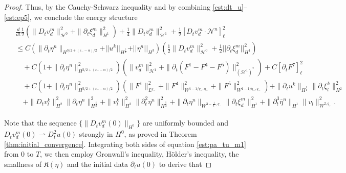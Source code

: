 \documentclass[letterpaper,reqno,10pt,twoside]{amsart}
\theoremstyle{definition}
\theoremstyle{remark}
\def\p{\partial}
\begin{document}
\begin{proof}
		Thus, by the Cauchy-Schwarz inequality and by combining \eqref{est:dt_u}--\eqref{est:ep5}, we conclude the energy structure
		\begin{align}
			\begin{aligned}
				&\frac{d}{dt}\frac12\left(\|D_tv_{d}^m\|_{\mathcal{H}^0}^2+\|\partial_{t}\xi_{d}^{m}\|_{H^{1}}^2\right)+\frac14\|D_tv_{d}^m\|_{\mathcal{H}^1}^2+\frac12[D_{t}v_{d}^{m}\cdot \mathcal{N}^{n}]_\ell^2\\
				&\le C(\|\p_t\eta^{n}\|_{H^{3/2+(\varepsilon_--\alpha)/2}}+\vert \vert u^{k}\vert \vert_{H^{\frac{5}{2}}}+\vert \vert \eta^{n}\vert \vert_{H^{3}})\left(\frac12\|D_tv_{d}^m\|_{\mathcal{H}^0}^2+\frac{1}{2}\vert \vert \partial_{t}\xi_{d}^{m}\vert \vert_{H^{1}}^{2}\right)\\
				&\quad +C\left(1+\|\p_t\eta^{n}\|_{H^{3/2+(\varepsilon_--\alpha)/2}}^2\right) ( \|v_{d}^m\|_{\mathcal{H}^1}^2 +\|\p_t(F^1-F^4-F^5)\|_{(\mathcal{H}^1)^{\ast}}^2)+C[\p_tF^7]_\ell^2\\
				&\quad+C\left(1+\|\p_t\eta^{n}\|_{H^{3/2+(\varepsilon_--\alpha)/2}}^2\right)(\|F^1\|_{L^{q_-}}^2+\|F^4\|_{W^{1-1/q_-,q_-}}^2+\|F^5\|_{W^{1-1/q_-,q_-}}^2)+\|\p_{t}u^{k}\|_{H^{\frac{5}{2}}}\|\p_{t}\xi_{l}^{k}\|^{2}_{H^{2}}\\
				&\quad+ \|D_{t}v_{l}^{k}\|^{2}_{H^{2}}\|\p_{t}\eta^{n}\|^{2}_{H^{\frac{5}{2}}}+\|v_{l}^{k}\|^{2}_{H^{2}}\|\p_{t}^{2}\eta^{n}\|^{2}_{H^{\frac{5}{2}}}+\|\p_{t}\eta^{n}\|_{W^{3-\frac{1}{q_{-}},q_{-}}}\|\p_{t}\xi_{d}^{m}\|_{H^{1}}^{2}+\|\p_{t}^{3}\bar{\eta}^{n}\|_{H^{1}}\|v_{l}\|_{W^{2,q_{+}}}^{2}\label{est:pa_tu_m1}.
			\end{aligned}
		\end{align}
		
		\noindent Note that the sequence $\{\|D_tv_{d}^m(0)\|_{H^0}\}$ are uniformly bounded and $D_tv_{d}^m(0) \rightharpoonup D_t^{2}u(0)$ strongly in $H^0$, as proved in Theorem \ref{thm:initial_convergence}. Integrating both sides of equation \eqref{est:pa_tu_m1} from $0$ to $T$, we then employ Gronwall's inequality, H\"older's inequality, the smallness of $\mathfrak{K}(\eta)$ and the initial data $\p_tu(0)$ to derive that 
		

\end{proof}
\end{document}
